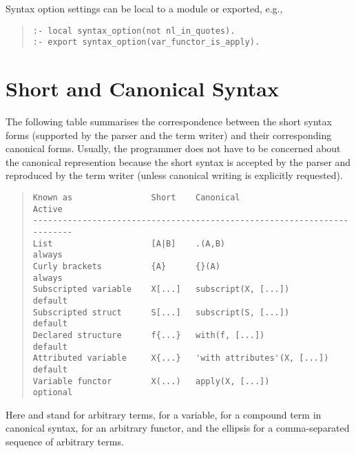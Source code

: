Syntax option  settings can be local to a module or exported, e.g.,
\begin{quote}
\begin{verbatim}
:- local syntax_option(not nl_in_quotes).
:- export syntax_option(var_functor_is_apply).
\end{verbatim}
\end{quote}

\section{Short and Canonical Syntax}

The following table summarises the correspondence between the short syntax
forms (supported by the parser and the term writer) and their corresponding
canonical forms. Usually, the programmer does not have to be concerned about
the canonical represention because the short syntax is accepted by the parser
and reproduced by the term writer (unless canonical writing is explicitly
requested).
\begin{quote}
\begin{verbatim}
Known as                Short    Canonical                    Active
------------------------------------------------------------------------
List                    [A|B]    .(A,B)                       always
Curly brackets          {A}      {}(A)                        always
Subscripted variable    X[...]   subscript(X, [...])          default
Subscripted struct      S[...]   subscript(S, [...])          default
Declared structure      f{...}   with(f, [...])               default
Attributed variable     X{...}   'with attributes'(X, [...])  default
Variable functor        X(...)   apply(X, [...])              optional
\end{verbatim}
\end{quote}
Here  and  stand for arbitrary terms,  for a
variable,  for a compound term in canonical syntax,  for
an arbitrary functor, and the ellipsis for a comma-separated sequence of
arbitrary terms.

